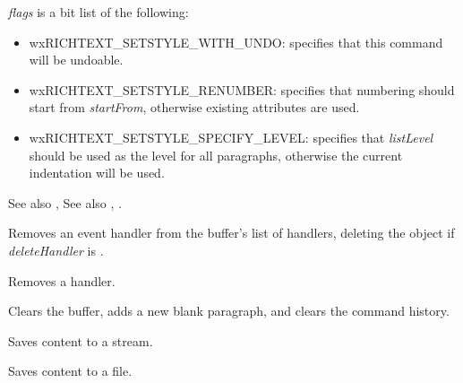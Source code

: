 {\it flags} is a bit list of the following:

\begin{itemize}\itemsep=0pt
\item wxRICHTEXT\_SETSTYLE\_WITH\_UNDO: specifies that this command will be undoable.
\item wxRICHTEXT\_SETSTYLE\_RENUMBER: specifies that numbering should start from {\it startFrom}, otherwise existing attributes are used.
\item wxRICHTEXT\_SETSTYLE\_SPECIFY\_LEVEL: specifies that {\it listLevel} should be used as the level for all paragraphs, otherwise the current indentation will be used.
\end{itemize}

See also , See also , .

\label{wxrichtextbufferremoveeventhandler}


Removes an event handler from the buffer's list of handlers, deleting the object if {\it deleteHandler} is \true.

\label{wxrichtextbufferremovehandler}


Removes a handler.

\label{wxrichtextbufferresetandclearcommands}


Clears the buffer, adds a new blank paragraph, and clears the command history.

\label{wxrichtextbuffersavefile}


Saves content to a stream.


Saves content to a file.

